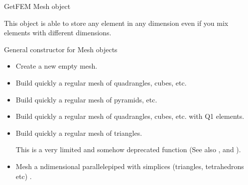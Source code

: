 \documentclass[a4paper,11pt,english]{sphinxmanual}
\begin{document}
\begin{fulllineitems}
\label{\detokenize{python/cmdref_Mesh:getfem.Mesh}}
GetFEM Mesh object

This object is able to store any element in any dimension even if you mix
elements with different dimensions.

General constructor for Mesh objects
\begin{itemize}
\item {} 
Create a new empty mesh.

\item {} 
Build quickly a regular mesh of quadrangles, cubes, etc.

\item {} 
Build quickly a regular mesh of pyramids, etc.

\item {} 
Build quickly a regular mesh of quadrangles, cubes, etc. with
Q1 elements.

\item {} 
Build quickly a regular mesh of triangles.

This is a very limited and somehow deprecated function (See also
,  and
).

\item {} 
Mesh a n\sphinxhyphen{}dimensional parallelepiped with simplices (triangles,
tetrahedrons etc) .


\end{itemize}
\end{fulllineitems}
\end{document}
